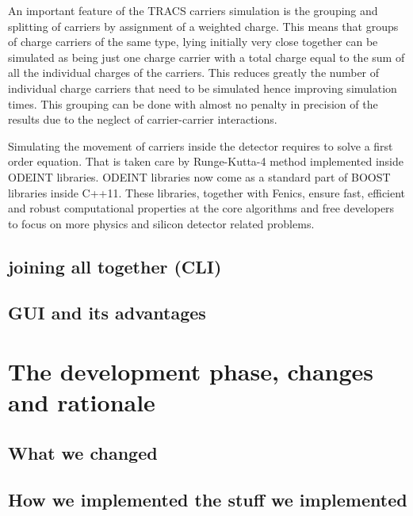 An important feature of the TRACS carriers simulation is the grouping and splitting of carriers by assignment of a weighted charge. This means that groups of charge carriers  of the same type, lying initially very close together can be simulated as being just one charge carrier with a total charge equal to the sum of all the individual charges of the carriers. This reduces greatly the number of individual charge carriers that need to be simulated hence improving simulation times. This grouping can be done with almost no penalty in precision of the results due to the neglect of carrier-carrier interactions.

Simulating the movement of carriers inside the detector requires to solve a first order equation. That is taken care by Runge-Kutta-4 method implemented inside ODEINT libraries. ODEINT libraries now come as a standard part of BOOST libraries inside C++11. These libraries, together with Fenics, ensure fast, efficient and robust computational properties at the core algorithms and free developers to focus on more physics and silicon detector related problems.



\subsection{joining all together (CLI)}


\subsection{GUI and its advantages}
\section{The development phase, changes and rationale} %
\label{sec:let_s_put_the_project_in_perspective}
\subsection{What we changed}
\subsection{How we implemented the stuff we implemented}

